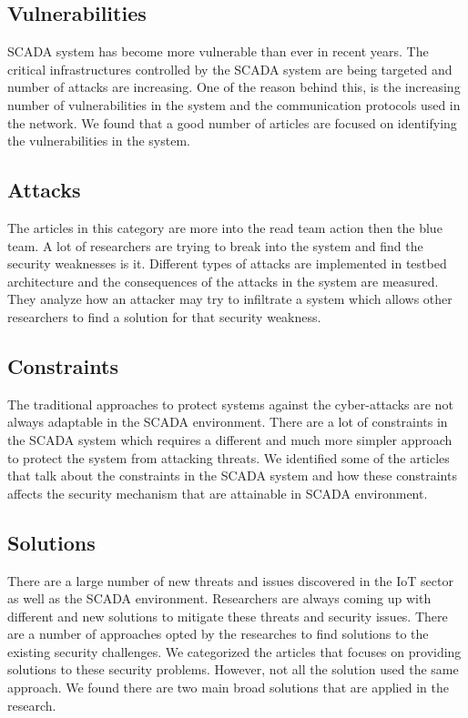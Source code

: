 \documentclass[letterpaper, 10 pt, conference]{ieeeconf}  %
\begin{document}

\subsection{Vulnerabilities}
SCADA system has become more vulnerable than ever in recent years. The critical infrastructures controlled by the SCADA system are being targeted and number of attacks are increasing. One of the reason behind this, is the increasing number of vulnerabilities in the system and the communication protocols used in the network. We found that a good number of articles are focused on identifying the vulnerabilities in the system.
\subsection{Attacks}
The articles in this category are more into the read team action then the blue team. A lot of researchers are trying to break into the system and find the security weaknesses is it. Different types of attacks are implemented in testbed architecture and the consequences of the attacks in the system are measured. They analyze how an attacker may try to infiltrate a system which allows other researchers to find a solution for that security weakness.
\subsection{Constraints}
The traditional approaches to protect systems against the cyber-attacks are not always adaptable in the SCADA environment. There are a lot of constraints in the SCADA system which requires a different and much more simpler approach to protect the system from attacking threats. We identified some of the articles that talk about the constraints in the SCADA system and how these constraints affects the security mechanism that are attainable in SCADA environment.
\subsection{Solutions}
There are a large number of new threats and issues discovered in the IoT sector as well as the SCADA environment. Researchers are always coming up with different and new solutions to mitigate these threats and security issues. There are a number of approaches opted by the researches to find solutions to the existing security challenges. We categorized the articles that focuses on providing solutions to these security problems. However, not all the solution used the same approach. We found there are two main broad solutions that are applied in the research.
\end{document}
